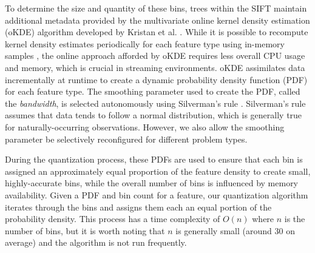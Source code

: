 \documentclass[9pt,journal,compsoc]{IEEEtran}
\begin{document}
To determine the size and quantity of these bins, trees within the SIFT maintain additional metadata provided by the multivariate online kernel density estimation (oKDE) algorithm developed by Kristan et al. \cite{kristan2011multivariate}. While it is possible to recompute kernel density estimates periodically for each feature type using in-memory samples \cite{malensek2013autonomously}, the online approach afforded by oKDE requires less overall CPU usage and memory, which is crucial in streaming environments.  oKDE assimilates data incrementally at runtime to create a dynamic probability density function (PDF) for each feature type. The smoothing parameter used to create the PDF, called the \emph{bandwidth}, is selected autonomously using Silverman's rule \cite{silverman1986density}. Silverman's rule assumes that data tends to follow a normal distribution, which is generally true for naturally-occurring observations. However, we also allow the smoothing parameter be selectively reconfigured for different problem types.

During the quantization process, these PDFs are used to ensure that each bin is assigned an approximately equal proportion of the feature density to create small, highly-accurate bins, while the overall number of bins is influenced by memory availability. Given a PDF and bin count for a feature, our quantization algorithm iterates through the bins and assigns them each an equal portion of the probability density. This process has a time complexity of $O(n)$ where $n$ is the number of bins, but it is worth noting that $n$ is generally small (around 30 on average) and the algorithm is not run frequently.
\end{document}
